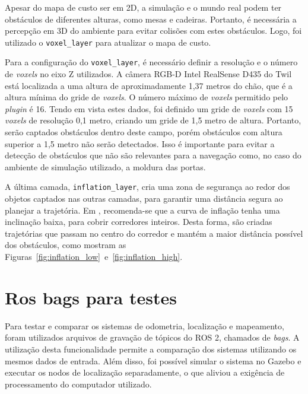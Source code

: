 \documentclass[repeatfields,xlists,xpacks,oneside,yearsonly]{ufrgscca}
\begin{document}
Apesar do mapa de custo ser em 2D, a simulação e o mundo real podem ter obstáculos
de diferentes alturas, como mesas e cadeiras. Portanto, é necessária a percepção em 
3D do ambiente para evitar colisões com estes obstáculos. Logo, foi utilizado o
\texttt{voxel\_layer} para atualizar o mapa de custo.

Para a configuração do \texttt{voxel\_layer}, é necessário definir a resolução
e o número de \textit{voxels} no eixo Z utilizados. 
A câmera RGB-D Intel RealSense D435 do Twil está localizada a uma altura de aproximadamente
1,37 metros do chão, que é a altura mínima do gride de \textit{voxels}.
O número máximo de \textit{voxels} permitido pelo \textit{plugin} é 16.
Tendo em vista estes dados, foi definido um gride de \textit{voxels} com 15 \textit{voxels}
de resolução 0,1 metro, criando um gride de 1,5 metro de altura.
Portanto, serão captados obstáculos dentro deste campo, porém obstáculos com altura
superior a 1,5 metro não serão detectados.
Isso é importante para evitar a detecção de obstáculos que não são relevantes para
a navegação como, no caso do ambiente de simulação utilizado, a moldura das portas.


A última camada, \texttt{inflation\_layer}, cria uma zona de segurança ao redor
dos objetos captados nas outras camadas, para garantir uma distância segura
ao planejar a trajetória.
Em \textcite{ros_tuning_guide}, recomenda-se que a curva de inflação tenha uma
inclinação baixa, para cobrir corredores inteiros.
Desta forma, são criadas trajetórias que passam no centro do corredor e
mantém a maior distância possível dos obstáculos,
como mostram as Figuras~\ref{fig:inflation_low}~e~\ref{fig:inflation_high}.

\section{Ros bags para testes}

Para testar e comparar os sistemas de odometria, localização e mapeamento,
foram utilizados arquivos de gravação de tópicos do ROS 2, chamados de 
\textit{bags}.
A utilização desta funcionalidade permite a comparação dos sistemas 
utilizando os mesmos dados de entrada.
Além disso, foi possível simular o sistema no Gazebo e executar os nodos 
de localização separadamente, o que aliviou a exigência de processamento
do computador utilizado.
\end{document}
